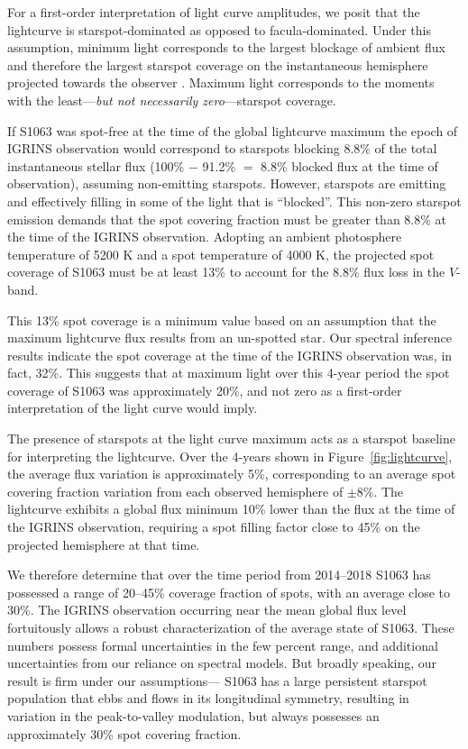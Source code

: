 \documentclass[modern,trackchanges]{aastex631}
\begin{document}
For a first-order interpretation of light curve amplitudes, we posit that the lightcurve is starspot-dominated as opposed to facula-dominated.  Under this assumption, minimum light corresponds to the largest blockage of ambient flux and therefore the largest starspot coverage on the instantaneous hemisphere projected towards the observer \cite{basri18}.  Maximum light corresponds to the moments with the least---\emph{but not necessarily zero}---starspot coverage.  

If S1063 was spot-free at the time of the global lightcurve maximum the epoch of IGRINS observation would correspond to starspots blocking 8.8\% of the total instantaneous stellar flux (100\% $-$ 91.2\% $=$ 8.8\% blocked flux at the time of observation), assuming non-emitting starspots. However, starspots are emitting and effectively filling in some of the light that is ``blocked''.  This non-zero starspot emission demands that the spot covering fraction must be greater than 8.8\% at the time of the IGRINS observation. Adopting an ambient photosphere temperature of 5200 K and a spot temperature of 4000 K, the projected spot coverage of S1063 must be at least 13\% to account for the 8.8\% flux loss in the $V$-band. 

This 13\% spot coverage is a minimum value based on an assumption that the maximum lightcurve flux results from an un-spotted star. Our spectral inference results indicate the spot coverage at the time of the IGRINS observation was, in fact, 32\%. This suggests that at maximum light over this 4-year period the spot coverage of S1063 was approximately 20\%, and not zero as a first-order interpretation of the light curve would imply. 

The presence of starspots at the light curve maximum acts as a starspot baseline for interpreting the lightcurve. Over the 4-years shown in Figure~\ref{fig:lightcurve}, the average flux variation is approximately 5\%, corresponding to an average spot covering fraction variation from each observed hemisphere of $\pm$8\%. The lightcurve exhibits a global flux minimum 10\% lower than the flux at the time of the IGRINS observation, requiring a spot filling factor close to 45\% on the projected hemisphere at that time.  

We therefore determine that over the time period from 2014--2018 S1063 has possessed a range of 20--45\% coverage fraction of spots, with an average close to 30\%. The IGRINS observation occurring near the mean global flux level fortuitously allows a robust characterization of the average state of S1063. These numbers possess formal uncertainties in the few percent range, and additional uncertainties from our reliance on spectral models.  But broadly speaking, our result is firm under our assumptions--- S1063 has a large persistent starspot population that ebbs and flows in its longitudinal symmetry, resulting in variation in the peak-to-valley modulation, but always possesses an approximately 30\% spot covering fraction.
\end{document}
